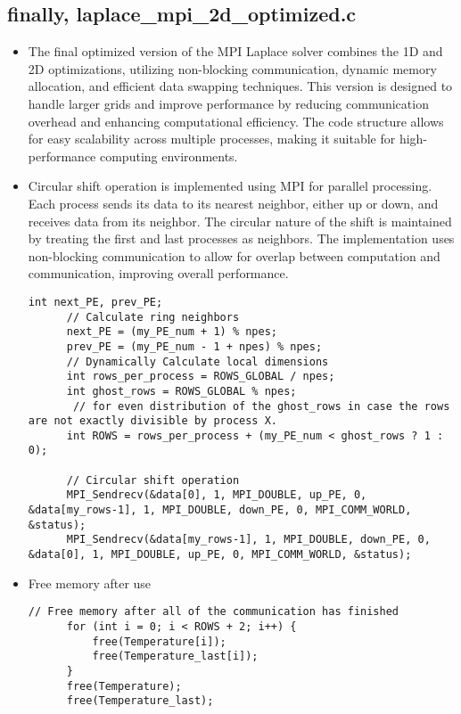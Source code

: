 \documentclass[11pt]{article}
\begin{document}
  \subsection{finally, laplace\_mpi\_2d\_optimized.c}
  \begin{itemize}
    \item {The final optimized version of the MPI Laplace solver combines the 1D and 2D optimizations, utilizing non-blocking communication, dynamic memory allocation, and efficient data swapping techniques. This version is designed to handle larger grids and improve performance by reducing communication overhead and enhancing computational efficiency. The code structure allows for easy scalability across multiple processes, making it suitable for high-performance computing environments.}
    \item {Circular shift operation is implemented using MPI for parallel processing. Each process sends its data to its nearest neighbor, either up or down, and receives data from its neighbor. The circular nature of the shift is maintained by treating the first and last processes as neighbors. The implementation uses non-blocking communication to allow for overlap between computation and communication, improving overall performance.}
    \begin{lstlisting}[style=dm4ds_lstCustom_01]
      int next_PE, prev_PE;
      // Calculate ring neighbors
      next_PE = (my_PE_num + 1) % npes;
      prev_PE = (my_PE_num - 1 + npes) % npes;
      // Dynamically Calculate local dimensions
      int rows_per_process = ROWS_GLOBAL / npes; 
      int ghost_rows = ROWS_GLOBAL % npes;
       // for even distribution of the ghost_rows in case the rows are not exactly divisible by process X.
      int ROWS = rows_per_process + (my_PE_num < ghost_rows ? 1 : 0);

      // Circular shift operation
      MPI_Sendrecv(&data[0], 1, MPI_DOUBLE, up_PE, 0, &data[my_rows-1], 1, MPI_DOUBLE, down_PE, 0, MPI_COMM_WORLD, &status);
      MPI_Sendrecv(&data[my_rows-1], 1, MPI_DOUBLE, down_PE, 0, &data[0], 1, MPI_DOUBLE, up_PE, 0, MPI_COMM_WORLD, &status);
    \end{lstlisting}
    \item {Free memory after use}
    \begin{lstlisting}[style=dm4ds_lstCustom_01]
            // Free memory after all of the communication has finished
      for (int i = 0; i < ROWS + 2; i++) {
          free(Temperature[i]);
          free(Temperature_last[i]);
      }
      free(Temperature);
      free(Temperature_last);
    \end{lstlisting}

  \end{itemize}
\end{document}

